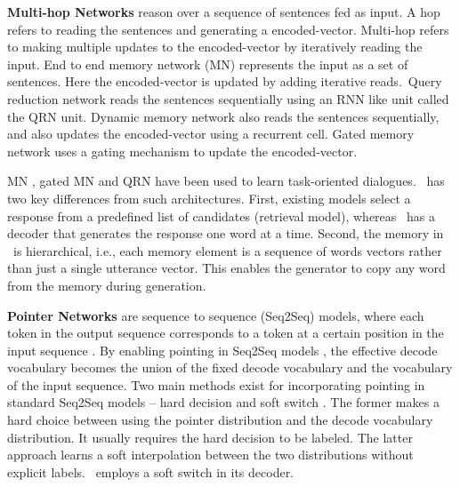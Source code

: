 \vspace{0.5ex}
\noindent
\textbf{Multi-hop Networks} reason over a sequence of sentences fed as input. A hop refers to reading the sentences and generating a encoded-vector. Multi-hop refers to making multiple updates to the encoded-vector by iteratively reading the input. End to end memory network (MN) \cite{sukhbaatar2015end} represents the input as a set of sentences. Here the encoded-vector is updated by adding iterative reads.~Query reduction network \cite{seo2016query} reads the sentences sequentially using an RNN like unit called the QRN unit. Dynamic memory network \cite{kumar2016ask} also reads the sentences sequentially, and also updates the encoded-vector using a recurrent cell. Gated memory network \cite{liu2017gated} uses a gating mechanism to update the encoded-vector. %

MN \cite{BordesW16}, gated MN and QRN have been used to learn task-oriented dialogues. \sys\ has two key differences from such architectures. First, existing models select a response from a predefined list of candidates (retrieval model), whereas \sys\ has a decoder that generates the response one word at a time. Second, the memory in \sys\ is hierarchical, i.e., each memory element is a sequence of words vectors rather than just a single utterance vector. This enables the generator to copy any word from the memory during generation.


\vspace{0.5ex}
\noindent\textbf{Pointer Networks}  are sequence to sequence (Seq2Seq) models, where each token in the output sequence corresponds to a token at a certain position in the input sequence \cite{vinyals2015pointer}. By enabling pointing in Seq2Seq models \cite{cho2014learning,sutskever2014sequence}, the effective decode vocabulary becomes the union of the fixed decode vocabulary and the vocabulary of the input sequence. Two main methods \cite{gu2016incorporating,eric2017copy} exist for incorporating pointing in standard Seq2Seq models -- hard decision \cite{nallapati2016abstractive,gu2016incorporating,eric2017copy} and soft switch \cite{see2017get}. The former makes a hard choice between using the pointer distribution and the decode vocabulary distribution. It usually requires the hard decision to be labeled. The latter approach learns a soft interpolation between the two distributions without explicit labels. \sys\ employs a soft switch in its decoder.

